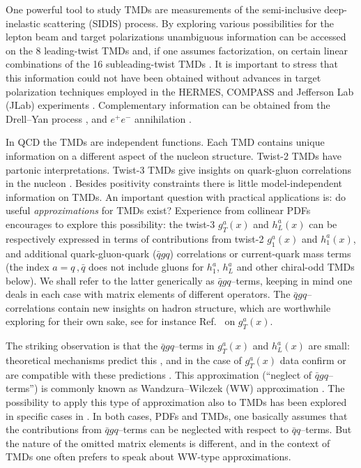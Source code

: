 \documentclass[a4paper,11pt]{article}
\begin{document}
One powerful tool to study TMDs are measurements of the
semi-inclusive deep-inelastic scattering (SIDIS) process.
By exploring various possibilities for the lepton beam and target
polarizations unambiguous information can be accessed on the 8 leading-twist
TMDs \cite{Boer:1997nt} and, if one assumes factorization, on certain
linear combinations of the 16 subleading-twist TMDs
\cite{Goeke:2005hb,Bacchetta:2006tn}.
	It is important to stress that this information could not have
	been obtained without advances in target polarization techniques
	employed in the HERMES, COMPASS and Jefferson Lab (JLab) experiments
	\cite{Stock:1994vv,Airapetian:2004yf,Crabb:1997cy,Goertz:2002vv}.
Complementary information can be obtained
from the Drell--Yan process \cite{Arnold:2008kf},
and $e^+e^-$ annihilation \cite{Metz:2016swz}.

In QCD the TMDs are independent functions. Each TMD contains unique
information on a different aspect of the nucleon structure.
Twist-2 TMDs have partonic interpretations. Twist-3 TMDs
give insights on quark-gluon correlations in the nucleon
\cite{Miller:2007ae,Burkardt:2007rv,Burkardt:2009rf}.
Besides positivity constraints \cite{Bacchetta:1999kz}
there is little model-independent information on TMDs.
An important question with practical applications is:
do useful {\sl approximations} for TMDs exist?
Experience from collinear PDFs encourages to explore this possibility:
the twist-3 $g_T^a(x)$ and $h_L^a(x)$ can be respectively expressed
in terms of contributions from twist-2 $g_1^a(x)$ and $h_1^a(x)$, and
additional quark-gluon-quark ($\bar{q}gq$) correlations or current-quark
mass terms \cite{Wandzura:1977qf,Jaffe:1991ra}
(the index $a=q\,,\bar q$ does not include gluons for
$h_1^a$, $h_L^a$ and other chiral-odd TMDs below).
We shall refer to the latter generically as $\bar{q}gq$--terms, keeping in
mind one deals in each case with matrix elements of different operators.
The $\bar{q}gq$--correlations contain new insights on hadron structure,
which are worthwhile exploring for their own sake,
see for instance Ref.~\cite{Jaffe:1989xx} on $g_T^a(x)$.

The striking observation is that the $\bar{q}gq$--terms in $g_T^a(x)$
and $h_L^a(x)$ are small: theoretical mechanisms predict this
\cite{Balla:1997hf,Dressler:1999hc,Gockeler:2000ja,Gockeler:2005vw},
and in the case of $g_T^a(x)$ data confirm or are compatible with these
predictions \cite{Abe:1998wq,Anthony:2002hy,Airapetian:2011wu}.
This approximation (``neglect of $\bar{q}gq$--terms'') is commonly
known as Wandzura--Wilczek (WW) approximation \cite{Wandzura:1977qf}.
The possibility to apply this type of approximation also to TMDs has
been explored in specific cases in \cite{Kotzinian:1995cz,Kotzinian:1997wt,
Kotzinian:2006dw,Avakian:2007mv,Metz:2008ib,Teckentrup:2009tk,Tangerman:1994bb}.
In both cases, PDFs and TMDs, one basically assumes that the
contributions from $\bar{q}gq$--terms can be neglected with respect to
$\bar{q}q$--terms. But the nature of the omitted matrix elements is
different, and in the context of TMDs one often prefers to speak
about WW-type approximations.
\end{document}
